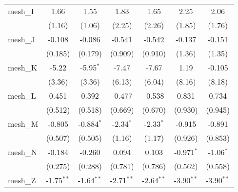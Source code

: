 \begin{tabular}{lcccccc}
   mesh\_I                                                     & 1.66           & 1.55           & 1.83           & 1.65           & 2.25           & 2.06\\   
                                                               & (1.16)         & (1.06)         & (2.25)         & (2.26)         & (1.85)         & (1.76)\\   
   mesh\_J                                                     & -0.108         & -0.086         & -0.541         & -0.542         & -0.137         & -0.151\\   
                                                               & (0.185)        & (0.179)        & (0.909)        & (0.910)        & (1.36)         & (1.35)\\   
   mesh\_K                                                     & -5.22          & -5.95$^{*}$    & -7.47          & -7.67          & 1.19           & -0.105\\   
                                                               & (3.36)         & (3.36)         & (6.13)         & (6.04)         & (8.16)         & (8.18)\\   
   mesh\_L                                                     & 0.451          & 0.392          & -0.477         & -0.538         & 0.831          & 0.734\\   
                                                               & (0.512)        & (0.518)        & (0.669)        & (0.670)        & (0.930)        & (0.945)\\   
   mesh\_M                                                     & -0.805         & -0.884$^{*}$   & -2.34$^{*}$    & -2.33$^{*}$    & -0.915         & -0.891\\   
                                                               & (0.507)        & (0.505)        & (1.16)         & (1.17)         & (0.926)        & (0.853)\\   
   mesh\_N                                                     & -0.184         & -0.260         & 0.094          & 0.103          & -0.971$^{*}$   & -1.06$^{*}$\\   
                                                               & (0.275)        & (0.288)        & (0.781)        & (0.786)        & (0.562)        & (0.558)\\   
   mesh\_Z                                                     & -1.75$^{**}$   & -1.64$^{**}$   & -2.71$^{**}$   & -2.64$^{**}$   & -3.90$^{**}$   & -3.90$^{**}$\\   

\end{tabular}
